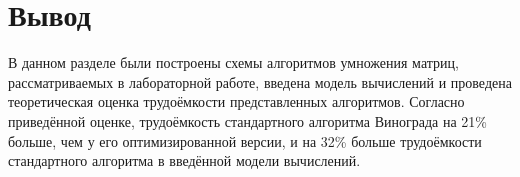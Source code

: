 \section*{Вывод}

В данном разделе были построены схемы алгоритмов умножения матриц, рассматриваемых в лабораторной работе, введена модель вычислений и проведена теоретическая оценка трудоёмкости представленных алгоритмов. Согласно приведённой оценке, трудоёмкость стандартного алгоритма Винограда на 21\% больше, чем у его оптимизированной версии, и на 32\% больше трудоёмкости стандартного алгоритма в введённой модели вычислений.

\clearpage
